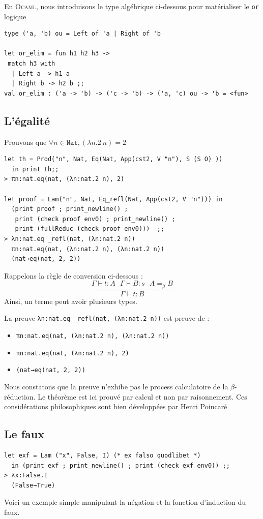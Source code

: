 En \textsc{Ocaml}, nous introduisons le type algébrique ci-dessous pour matérialiser le \verb+or+ logique
\begin{Verbatim}
type ('a, 'b) ou = Left of 'a | Right of 'b	

let or_elim = fun h1 h2 h3 ->
 match h3 with
  | Left a -> h1 a
  | Right b -> h2 b ;;
val or_elim : ('a -> 'b) -> ('c -> 'b) -> ('a, 'c) ou -> 'b = <fun>
\end{Verbatim}

\subsection{L'égalité}
Prouvons que $\forall n \in \mathtt{Nat}, (\lambda n.2\  n) = 2$
\begin{Verbatim}
let th = Prod("n", Nat, Eq(Nat, App(cst2, V "n"), S (S O) )) 
  in print th;;
> πn:nat.eq(nat, (λn:nat.2 n), 2)

let proof = Lam("n", Nat, Eq_refl(Nat, App(cst2, V "n"))) in 
  (print proof ; print_newline() ;
   print (check proof env0) ; print_newline() ; 
   print (fullReduc (check proof env0)))  ;;
> λn:nat.eq _refl(nat, (λn:nat.2 n))
  πn:nat.eq(nat, (λn:nat.2 n), (λn:nat.2 n))
  (nat→eq(nat, 2, 2))
\end{Verbatim}
Rappelons la règle de conversion ci-dessous :
$$
\frac{\Gamma \vdash  t:A \ \ \     \Gamma \vdash  B:s \ \ \     A=_\beta B}{\Gamma \vdash  t:B}
$$
Ainsi, un terme peut avoir plusieurs types.

\noindent La preuve \verb+λn:nat.eq _refl(nat, (λn:nat.2 n))+ est preuve de :
\begin{itemize}
 \item \verb+πn:nat.eq(nat, (λn:nat.2 n), (λn:nat.2 n))+
 \item \verb+πn:nat.eq(nat, (λn:nat.2 n), 2)+
 \item \verb+(nat→eq(nat, 2, 2))+
\end{itemize}
Nous constatons que la preuve n'exhibe pas le process calculatoire de la $\beta$-réduction.
Le théorème est ici prouvé par calcul et non par raisonnement. Ces considérations philosophiques sont bien développées
par Henri Poincaré\cite{poincare}

\subsection{Le faux}

\begin{Verbatim}
let exf = Lam ("x", False, I) (* ex falso quodlibet *)
  in (print exf ; print_newline() ; print (check exf env0)) ;;
> λx:False.I
  (False→True) 
\end{Verbatim}
Voici un exemple simple manipulant la négation et la fonction d'induction du faux.  

